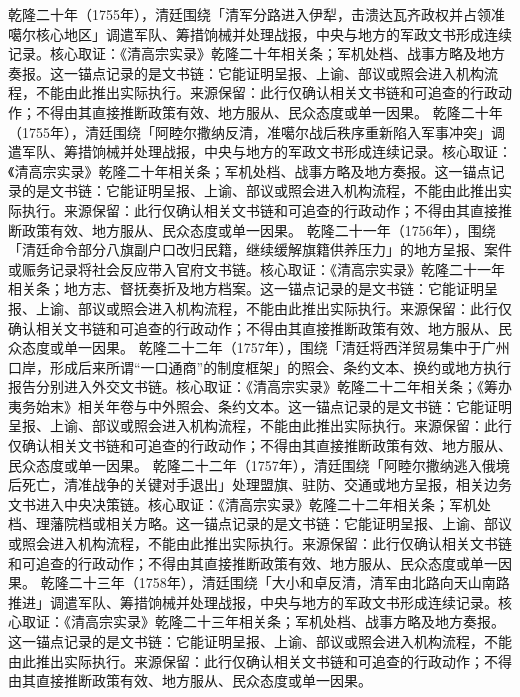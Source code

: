 乾隆二十年（1755年），清廷围绕「清军分路进入伊犁，击溃达瓦齐政权并占领准噶尔核心地区」调遣军队、筹措饷械并处理战报，中央与地方的军政文书形成连续记录。核心取证：《清高宗实录》乾隆二十年相关条；军机处档、战事方略及地方奏报。这一锚点记录的是文书链：它能证明呈报、上谕、部议或照会进入机构流程，不能由此推出实际执行。来源保留：此行仅确认相关文书链和可追查的行政动作；不得由其直接推断政策有效、地方服从、民众态度或单一因果。
乾隆二十年（1755年），清廷围绕「阿睦尔撒纳反清，准噶尔战后秩序重新陷入军事冲突」调遣军队、筹措饷械并处理战报，中央与地方的军政文书形成连续记录。核心取证：《清高宗实录》乾隆二十年相关条；军机处档、战事方略及地方奏报。这一锚点记录的是文书链：它能证明呈报、上谕、部议或照会进入机构流程，不能由此推出实际执行。来源保留：此行仅确认相关文书链和可追查的行政动作；不得由其直接推断政策有效、地方服从、民众态度或单一因果。
乾隆二十一年（1756年），围绕「清廷命令部分八旗副户口改归民籍，继续缓解旗籍供养压力」的地方呈报、案件或赈务记录将社会反应带入官府文书链。核心取证：《清高宗实录》乾隆二十一年相关条；地方志、督抚奏折及地方档案。这一锚点记录的是文书链：它能证明呈报、上谕、部议或照会进入机构流程，不能由此推出实际执行。来源保留：此行仅确认相关文书链和可追查的行政动作；不得由其直接推断政策有效、地方服从、民众态度或单一因果。
乾隆二十二年（1757年），围绕「清廷将西洋贸易集中于广州口岸，形成后来所谓“一口通商”的制度框架」的照会、条约文本、换约或地方执行报告分别进入外交文书链。核心取证：《清高宗实录》乾隆二十二年相关条；《筹办夷务始末》相关年卷与中外照会、条约文本。这一锚点记录的是文书链：它能证明呈报、上谕、部议或照会进入机构流程，不能由此推出实际执行。来源保留：此行仅确认相关文书链和可追查的行政动作；不得由其直接推断政策有效、地方服从、民众态度或单一因果。
乾隆二十二年（1757年），清廷围绕「阿睦尔撒纳逃入俄境后死亡，清准战争的关键对手退出」处理盟旗、驻防、交通或地方呈报，相关边务文书进入中央决策链。核心取证：《清高宗实录》乾隆二十二年相关条；军机处档、理藩院档或相关方略。这一锚点记录的是文书链：它能证明呈报、上谕、部议或照会进入机构流程，不能由此推出实际执行。来源保留：此行仅确认相关文书链和可追查的行政动作；不得由其直接推断政策有效、地方服从、民众态度或单一因果。
乾隆二十三年（1758年），清廷围绕「大小和卓反清，清军由北路向天山南路推进」调遣军队、筹措饷械并处理战报，中央与地方的军政文书形成连续记录。核心取证：《清高宗实录》乾隆二十三年相关条；军机处档、战事方略及地方奏报。这一锚点记录的是文书链：它能证明呈报、上谕、部议或照会进入机构流程，不能由此推出实际执行。来源保留：此行仅确认相关文书链和可追查的行政动作；不得由其直接推断政策有效、地方服从、民众态度或单一因果。
